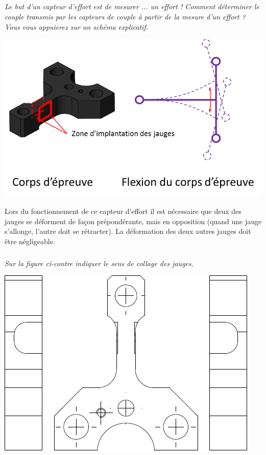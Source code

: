\documentclass[10pt]{article}
\begin{document}
\begin{minipage}[c]{.49\linewidth}
\subparagraph{}
\textit{Le but d'un capteur d'effort est de mesurer ... un effort ! Comment déterminer le couple transmis par les capteurs de couple à partir de la mesure d'un effort ? Vous vous appuierez sur un schéma explicatif. }
\end{minipage} \hfill
\begin{minipage}[c]{.49\linewidth}
\begin{center}
\includegraphics[width=.95\textwidth]{images/flexionCorps}
\end{center}
\end{minipage}




\begin{minipage}[c]{.49\linewidth}
Lors du fonctionnement de ce capteur d'effort il est nécessaire que deux des jauges se déforment de façon prépondérante, mais en opposition (quand une jauge s'allonge, l'autre doit se rétracter). La déformation des deux autres jauges doit être négligeable. 


\subparagraph{}
\textit{Sur la figure ci-contre indiquer le sens de collage des jauges. }
\end{minipage} \hfill
\begin{minipage}[c]{.49\linewidth}
\begin{center}
\includegraphics[width=.8\textwidth]{images/PlanJauge}
\end{center}
\end{minipage}
\end{document}
